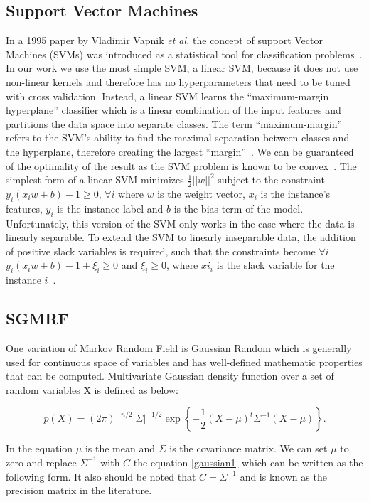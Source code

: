 \documentclass{article} %
\begin{document}
\subsection{Support Vector Machines}
In a 1995 paper by Vladimir Vapnik \emph{et al.} the concept of support 
Vector Machines (SVMs) was introduced  as a statistical tool for 
classification problems~\cite{shmilovici2005support}. In our work we
use the most simple SVM, a linear SVM, because it does not use non-linear
kernels and therefore has no hyperparameters that need to be tuned
with cross validation. Instead, a linear SVM learns the ``maximum-margin
hyperplane'' classifier which is a linear combination of the input 
features and partitions the data space into separate classes. The term 
``maximum-margin'' refers to the SVM's ability to find the maximal 
separation between classes and the hyperplane, therefore creating the 
largest ``margin''~\cite{shmilovici2005support}. We can be guaranteed of
the optimality of the result as the SVM problem is known to be 
convex~\cite{burges1998tutorial}. The simplest form of a linear SVM 
minimizes $\frac{1}{2}||w||^2$ subject to the constraint 
$y_i (x_i w + b) - 1 \ge 0 $, $\forall i$ where $w$ is the weight vector,
$x_i$ is the instance's features, $y_i$ is the instance label and $b$ is
the bias term of the model. Unfortunately, this version of the SVM only
works in the case where the data is linearly separable. To extend the SVM
to linearly inseparable data, the addition of positive slack variables is
required, such that the constraints become $\forall i$ 
$y_i (x_i w + b) - 1 + \xi_i \ge 0 $ and $\xi_i \ge 0$, where $xi_i$ is 
the slack variable for the instance $i$~\cite{burges1998tutorial}.


\subsection{SGMRF}
One variation of Markov Random Field is Gaussian Random which is generally 
used for continuous space of variables and has well-defined mathematic 
properties that can be computed. Multivariate Gaussian density function 
over a set of random variables X is defined as below: 

\begin{equation}\label{gaussian1}
p(X) = (2\pi)^{-n/2} |\Sigma|^{-1/2} \exp\left\{ -\frac{1}{2}(X - \mu)^t \Sigma^{-1} (X - \mu) \right\}.
\end{equation}
 
In the equation $\mu$ is the mean and $\Sigma$ is the covariance matrix. 
We can set $\mu$ to zero and replace $\Sigma^{-1}$ with $C$ the 
equation \eqref{gaussian1} which can be written as the following form. 
It also should be noted that $C = \Sigma^{-1}$ and is known as the 
precision matrix in the literature.  
\end{document}
